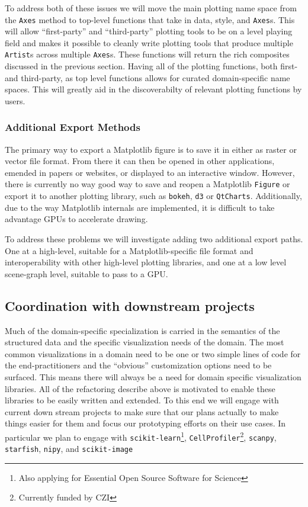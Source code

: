 \documentclass[11pt]{article}  %
\begin{document}
To address both of these issues we will move the main plotting name
space from the \texttt{Axes} method to top-level functions that take in
data, style, and \texttt{Axes}s.  This will allow ``first-party'' and
``third-party'' plotting tools to be on a level playing field and
makes it possible to cleanly write plotting tools that produce
multiple \texttt{Artist}s across multiple \texttt{Axes}s.  These
functions will return the rich composites discussed in the previous
section.  Having all of the plotting functions, both first- and
third-party, as top level functions allows for curated domain-specific
name spaces.  This will greatly aid in the discoverabilty of relevant
plotting functions by users.



\subsubsection{Additional Export Methods}

The primary way to export a Matplotlib figure is to save it in either
as raster or vector file format.  From there it can then be opened in
other applications, emended in papers or websites, or displayed to an
interactive window.  However, there is currently no way good way to
save and reopen a Matplotlib \texttt{Figure} or export it to another
plotting library, such as \texttt{bokeh}, \texttt{d3} or
\texttt{QtCharts}.  Additionally, due to the way Matplotlib internals
are implemented, it is difficult to take advantage GPUs to accelerate
drawing.

To address these problems we will investigate adding two additional
export paths.  One at a high-level, suitable for a Matplotlib-specific
file format and interoperability with other high-level plotting
libraries, and one at a low level scene-graph level, suitable to pass
to a GPU.


\subsection{Coordination with downstream projects}

Much of the domain-specific specialization is carried in the semantics
of the structured data and the specific visualization needs of the
domain.  The most common visualizations in a domain need to be one or
two simple lines of code for the end-practitioners and the ``obvious''
customization options need to be surfaced.  This means there will
always be a need for domain specific visualization libraries.  All of
the refactoring describe above is motivated to enable these libraries
to be easily written and extended.  To this end we will engage with
current down stream projects to make sure that our plans actually to
make things easier for them and focus our prototyping efforts on their
use cases.  In particular we plan to engage with
\texttt{scikit-learn}\footnote{Also applying for Essential Open Source
Software for Science}, \texttt{CellProfiler}\footnote{Currently funded
by CZI\label{f:czi}}, \texttt{scanpy},
\texttt{starfish}, \texttt{nipy}, and
\texttt{scikit-image}
\end{document}
